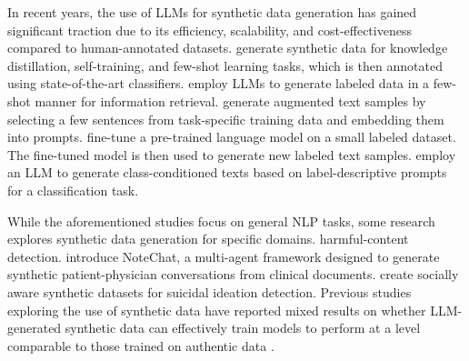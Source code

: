 In recent years, the use of LLMs for synthetic data generation has gained significant traction due to its efficiency, scalability, and cost-effectiveness compared to human-annotated datasets.
 generate
synthetic data for knowledge distillation, self-training, and few-shot learning tasks, which is then annotated using state-of-the-art classifiers.
 employ LLMs
to generate labeled data in a few-shot manner for information retrieval.
 generate
augmented text samples by selecting a few sentences from task-specific training data and embedding them into prompts.
 fine-tune a pre-trained language model
on a small labeled dataset. The fine-tuned model is then used to generate new labeled text samples.
 employ an LLM
to generate class-conditioned texts based on label-descriptive prompts for a classification task.


While the aforementioned studies focus on general NLP tasks, some research
explores synthetic data generation for specific domains. %
harmful-content detection.
 introduce NoteChat, a multi-agent framework designed to generate synthetic patient-physician conversations from clinical documents.
 create socially aware synthetic datasets for suicidal ideation detection.
Previous studies exploring the use of synthetic data have reported mixed results on whether LLM-generated synthetic data can effectively train models to perform at a level comparable to those trained on authentic data \cite{li-etal-2023-synthetic}.


